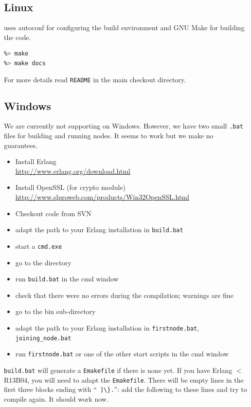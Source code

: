 \documentclass[a4paper]{scrreprt}
\newcommand{\code}[1]{\lstinline[basicstyle=\ttfamily]!#1!}
\begin{document}
\subsection{Linux}

\scalaris{} uses autoconf for configuring the build environment and
GNU Make for building the code.

\begin{lstlisting}[language=sh]
%> ./configure
%> make
%> make docs
\end{lstlisting}

For more details read \code{README} in the main \scalaris{} checkout
directory.

\subsection{Windows}

We are currently not supporting \scalaris{} on Windows. However, we
have two small {\tt .bat} files for building and running \scalaris{}
nodes. It seems to work but we make no guarantees.

\begin{itemize}
\item Install Erlang\\
       \url{http://www.erlang.org/download.html}
\item Install OpenSSL (for crypto module)\\
       \url{http://www.slproweb.com/products/Win32OpenSSL.html}
\item Checkout \scalaris{} code from SVN
\item adapt the path to your Erlang installation in \code{build.bat}
\item start a \code{cmd.exe}
\item go to the \scalaris{} directory
\item run \code{build.bat} in the cmd window
\item check that there were no errors during the compilation;
       warnings are fine
\item go to the bin sub-directory
\item adapt the path to your Erlang installation in \code{firstnode.bat},
       \code{joining_node.bat}
\item run \code{firstnode.bat} or one of the other start scripts in the cmd window
\end{itemize}

\code{build.bat} will generate a \code{Emakefile} if there is none yet.
If you have Erlang $<$ R13B04, you will need to adapt the \code{Emakefile}.
There will be empty lines in the first three blocks ending with
``\code{ ]\}.}'': add the following to these lines and try to compile again.
It should work now.
\end{document}
